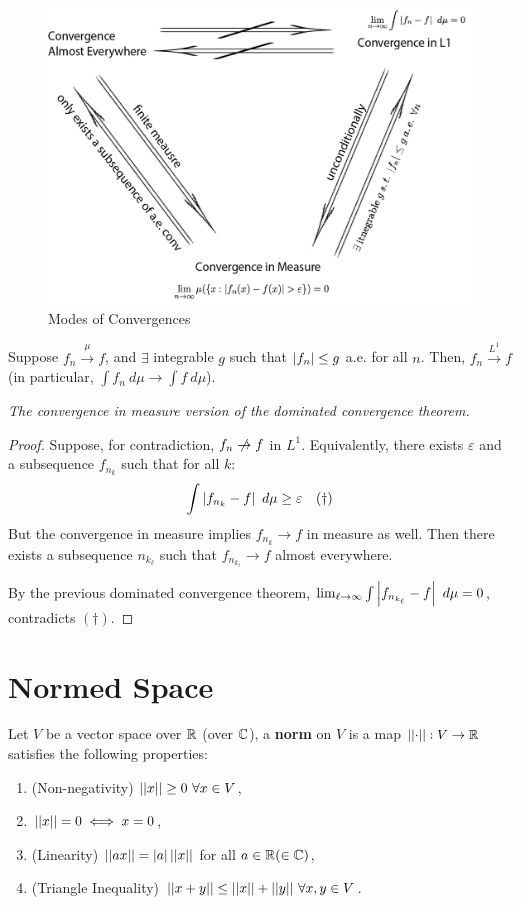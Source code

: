 \documentclass[11pt]{article}
\begin{document}
	\begin{figure}[H]
		\caption{Modes of Convergences}
		\medbreak
		\centering
		\includegraphics[width=0.7\linewidth]{mode_of_convergence.png}
	\end{figure}
	
	\begin{proposition}
		Suppose $f_n \overset{\mu}{\to} f$, and $\exists$ integrable $g$ such that $\left \vert {f_n} \right \vert \leq g$ a.e. for all $n$. Then, $f_n \overset{L^1}{\to} f$ (in particular, $\int f_n\ d\mu \to \int f\ d\mu$).
		
		\emph{The convergence in measure version of the dominated convergence theorem.}
		\begin{proof}
			Suppose, for contradiction, $f_n \centernot \to f$ in $L^1$. Equivalently, there exists $\varepsilon$ and a subsequence $f_{n_k}$ such that for all $k$:
			\begin{align}
				\int \left \vert {f_{n_k} - f} \right \vert\ d\mu \geq \varepsilon \quad (\dagger)
			\end{align}
			But the convergence in measure implies $f_{n_k} \to f$ in measure as well. Then there exists a subsequence $n_{k_\ell}$ such that $f_{n_{k_\ell}} \to f$ almost everywhere.
			
			By the previous dominated convergence theorem, $\lim_{\ell \to \infty} \int \left \vert {f_{n_{k_\ell}} - f} \right \vert\ d\mu = 0$, contradicts $(\dagger)$.
		\end{proof}
	\end{proposition}
	
	\newpage
	\section{Normed Space}
	\begin{definition}
		Let $V$ be a vector space over $\mathbb{R}$ (over $\mathbb{C}$), a \textbf{norm} on $V$ is a map $\vert \vert {\cdot} \vert \vert: V \to \mathbb{R}$ satisfies the following properties:
		\begin{enumerate}
			\item (Non-negativity) $\norm{x} \geq 0\ \forall x \in V$,
			\item $\vert \vert {x} \vert \vert = 0 \iff x = 0$,
			\item (Linearity) $\vert \vert {a x} \vert \vert = \left \vert {a} \right \vert \vert \vert {x} \vert \vert$ for all $a \in \mathbb{R}(\in \mathbb{C})$,
			\item (Triangle Inequality) $\vert \vert {x + y} \vert \vert \leq \vert \vert {x} \vert \vert + \vert \vert {y} \vert \vert\ \forall x, y \in V$.
		\end{enumerate}
	\end{definition}
	
\end{document}

